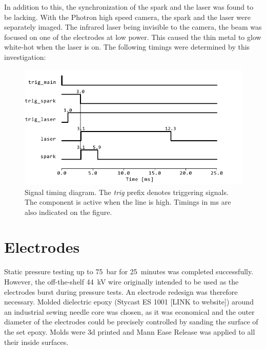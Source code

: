             In addition to this, the synchronization of the spark and the laser was found to be lacking. With the Photron high speed camera, the spark and the laser were separately imaged. The infrared laser being invisible to the camera, the beam was focused on one of the electrodes at low power. This caused the thin metal to glow white-hot when the laser is on. The following timings were determined by this investigation:

            \begin{figure}
                \centering
                \includegraphics[width=\textwidth]{assets/4 experiments/timings.pdf}
                \caption{Signal timing diagram. The \textit{trig} prefix denotes triggering signals. The component is active when the line is high. Timings in \unit{ms} are also indicated on the figure.}
            \end{figure}

        \section{Electrodes}
            Static pressure testing up to \qty{75}{bar} for \qty{25}{minutes} was completed successfully. However, the off-the-shelf \qty{44}{kV} wire originally intended to be used as the electrodes burst during pressure tests. An electrode redesign was therefore necessary. Molded dielectric epoxy (Stycast ES 1001 [LINK to website]) around an industrial sewing needle core was chosen, as it was economical and the outer diameter of the electrodes could be precisely controlled by sanding the surface of the set epoxy. Molds were 3d printed and Mann Ease Release was applied to all their inside surfaces.

